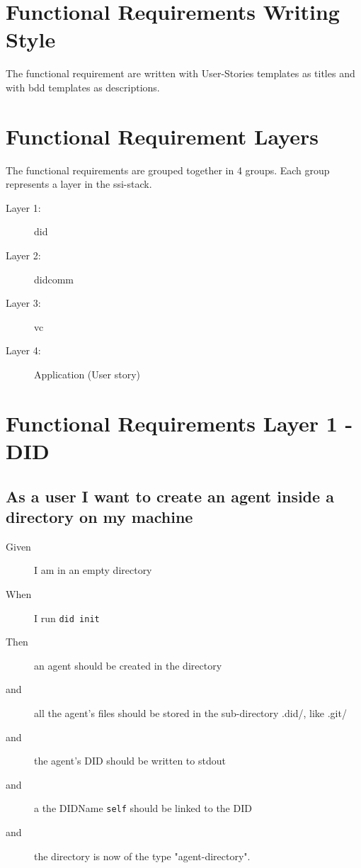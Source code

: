 \newpage

\section{Functional Requirements Writing Style}

The functional requirement are written with User-Stories templates as titles and with \acrfull{bdd} templates as descriptions.


\section{Functional Requirement Layers}

The functional requirements are grouped together in 4 groups. Each group represents a layer in the \acrshort{ssi}-stack.
\begin{description}
    \item[Layer 1:] \acrfull{did}
    \item[Layer 2:] \acrfull{didcomm}
    \item[Layer 3:] \acrfull{vc}
    \item[Layer 4:] Application (User story)
\end{description}


\newpage

\section{Functional Requirements Layer 1 - DID}


\subsection{As a user I want to create an agent inside a directory on my machine}
\begin{description}\begin{description}
    \item[Given] I am in an empty directory
    \item[When] I run \texttt{did init}
    \item[Then] an agent should be created in the directory
    \item[and] all the agent's files should be stored in the sub-directory .did/, like .git/
    \item[and] the agent's DID should be written to stdout 
    \item[and] a the DIDName \texttt{self} should be linked to the DID
    \item[and] the directory is now of the type "agent-directory".
\end{description}\end{description}



